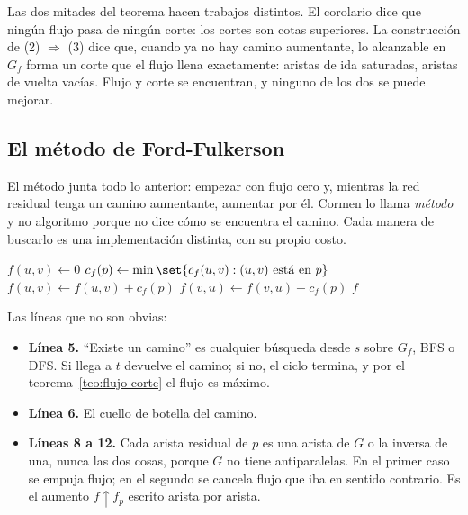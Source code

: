 \documentclass[11pt,letterpaper]{article}
\begin{document}
\begin{idea}
  Las dos mitades del teorema hacen trabajos distintos. El corolario
  dice que ningún flujo pasa de ningún corte: los cortes son cotas
  superiores. La construcción de (2) $\Rightarrow$ (3) dice que,
  cuando ya no hay camino aumentante, lo alcanzable en $G_f$ forma un
  corte que el flujo llena exactamente: aristas de ida saturadas,
  aristas de vuelta vacías. Flujo y corte se encuentran, y ninguno de
  los dos se puede mejorar.
\end{idea}


\subsection*{El método de Ford-Fulkerson}

El método junta todo lo anterior: empezar con flujo cero y, mientras
la red residual tenga un camino aumentante, aumentar por él. Cormen lo
llama \emph{método} y no algoritmo porque no dice cómo se encuentra el
camino. Cada manera de buscarlo es una implementación distinta, con su
propio costo.

\begin{algorithm}[H]
\caption{\textsc{Ford-Fulkerson}$(G, s, t)$}
\label{alg:ford-fulkerson}
\begin{algorithmic}[1]
    \State $f(u, v) \gets 0$
  \EndFor
    \State $c_f(p) \gets \min\set{c_f(u, v) : (u, v) \text{ está en }
           p}$
        \State $f(u, v) \gets f(u, v) + c_f(p)$
      \Else
        \State $f(v, u) \gets f(v, u) - c_f(p)$
      \EndIf
    \EndFor
  \EndWhile
  \State \Return $f$
\EndProcedure
\end{algorithmic}
\end{algorithm}

Las líneas que no son obvias:
\begin{itemize}[beginpenalty=10000]
  \item \textbf{Línea 5.} ``Existe un camino'' es cualquier búsqueda
        desde $s$ sobre $G_f$, BFS o DFS. Si llega a $t$ devuelve el
        camino; si no, el ciclo termina, y por el
        teorema~\ref{teo:flujo-corte} el flujo es máximo.
  \item \textbf{Línea 6.} El cuello de botella del camino.
  \item \textbf{Líneas 8 a 12.} Cada arista residual de $p$ es una
        arista de $G$ o la inversa de una, nunca las dos cosas, porque
        $G$ no tiene antiparalelas. En el primer caso se empuja flujo;
        en el segundo se cancela flujo que iba en sentido contrario.
        Es el aumento $f \uparrow f_p$ escrito arista por arista.
\end{itemize}
\end{document}
